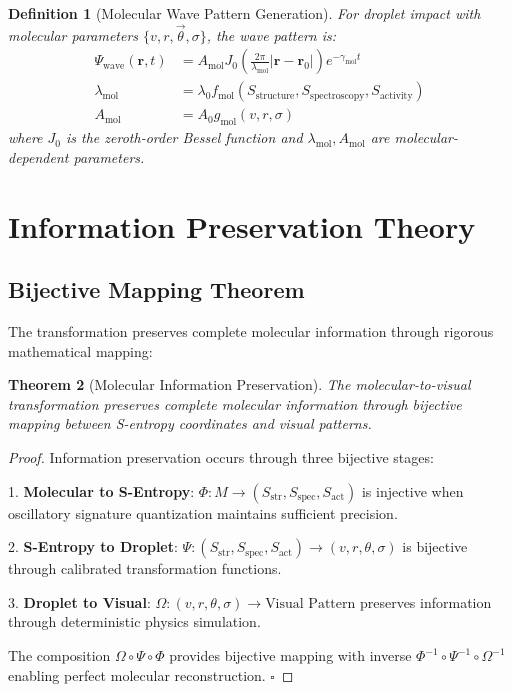 \documentclass[12pt,a4paper]{article}
\newtheorem{theorem}{Theorem}[section]
\newtheorem{definition}[theorem]{Definition}
\begin{document}
\begin{definition}[Molecular Wave Pattern Generation]
For droplet impact with molecular parameters $\{v, r, \vec{\theta}, \sigma\}$, the wave pattern is:
\begin{align}
\Psi_{\text{wave}}(\mathbf{r}, t) &= A_{\text{mol}} J_0\left(\frac{2\pi}{\lambda_{\text{mol}}} |\mathbf{r} - \mathbf{r}_0|\right) e^{-\gamma_{\text{mol}} t} \\
\lambda_{\text{mol}} &= \lambda_0 f_{\text{mol}}(S_{\text{structure}}, S_{\text{spectroscopy}}, S_{\text{activity}}) \\
A_{\text{mol}} &= A_0 g_{\text{mol}}(v, r, \sigma)
\end{align}
where $J_0$ is the zeroth-order Bessel function and $\lambda_{\text{mol}}, A_{\text{mol}}$ are molecular-dependent parameters.
\end{definition}

\section{Information Preservation Theory}

\subsection{Bijective Mapping Theorem}

The transformation preserves complete molecular information through rigorous mathematical mapping:

\begin{theorem}[Molecular Information Preservation]
The molecular-to-visual transformation preserves complete molecular information through bijective mapping between S-entropy coordinates and visual patterns.
\end{theorem}

\begin{proof}
Information preservation occurs through three bijective stages:

1. \textbf{Molecular to S-Entropy}: $\Phi: M \rightarrow (S_{\text{str}}, S_{\text{spec}}, S_{\text{act}})$ is injective when oscillatory signature quantization maintains sufficient precision.

2. \textbf{S-Entropy to Droplet}: $\Psi: (S_{\text{str}}, S_{\text{spec}}, S_{\text{act}}) \rightarrow (v, r, \theta, \sigma)$ is bijective through calibrated transformation functions.

3. \textbf{Droplet to Visual}: $\Omega: (v, r, \theta, \sigma) \rightarrow \text{Visual Pattern}$ preserves information through deterministic physics simulation.

The composition $\Omega \circ \Psi \circ \Phi$ provides bijective mapping with inverse $\Phi^{-1} \circ \Psi^{-1} \circ \Omega^{-1}$ enabling perfect molecular reconstruction. $\square$
\end{proof}
\end{document}
